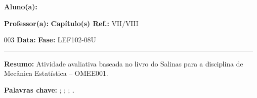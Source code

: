 \noindent \textbf{Aluno(a):} \imprimirautor
\par\noindent \textbf{Professor(a):} \imprimirorientador\hfill{}\textbf{Capítulo(s) Ref.:} VII/VIII  
\par\noindent \textbf{\imprimirtipotrabalho} 003  \hfill{}\textbf{Data:} \imprimirdata\hfill{}\textbf{Fase:} LEF102-08U
\rule{\textwidth}{.5pt}
\bigskip{}
\begin{center}
	\ABNTEXchapterfont\Large\MakeUppercase{\imprimirtitulo}
\end{center}

\noindent \textbf{Resumo:} Atividade avaliativa baseada no livro do Salinas \cite{SALINAS:2001} para a disciplina de Mecânica Estatística – OMEE001.

\par\noindent \textbf{Palavras chave:} \firstkey; \secondkey; \thirdkey; \fourthkey.
%